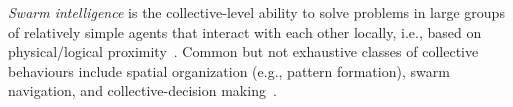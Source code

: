 

\emph{Swarm intelligence}
 is the collective-level ability to solve problems
 in large groups of relatively simple agents that interact with each other locally, i.e., based on physical/logical proximity~\cite{DBLP:books/daglib/0032898}.
%
%
%
%
Common but not exhaustive classes of collective behaviours
 include spatial organization (e.g., pattern formation),
 swarm navigation,
 and collective-decision making~\cite{DBLP:journals/swarm/BrambillaFBD13}.
%

